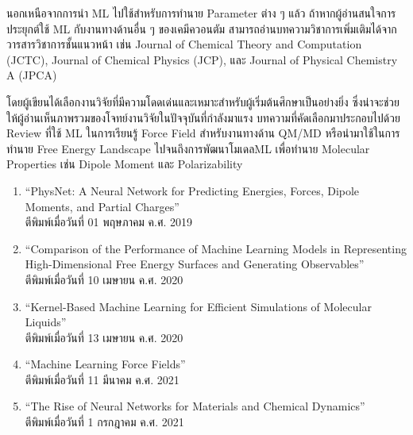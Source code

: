 นอกเหนือจากการนำ ML ไปใช้สำหรับการทำนาย Parameter ต่าง ๆ แล้ว ถ้าหากผู้อ่านสนใจการประยุกต์ใช้ ML กับงานทางด้านอื่น ๆ ของเคมีควอนตัม 
สามารถอ่านบทความวิชาการเพิ่มเติมได้จากวารสารวิชาการชั้นแนวหน้า เช่น Journal of Chemical Theory and Computation (JCTC), 
Journal of Chemical Physics (JCP), และ Journal of Physical Chemistry A (JPCA)

โดยผู้เขียนได้เลือกงานวิจัยที่มีความโดดเด่นและเหมาะสำหรับผู้เริ่มต้นศึกษาเป็นอย่างยิ่ง ซึ่งน่าจะช่วยให้ผู้อ่านเห็นภาพรวมของโจทย์งานวิจัยในปัจจุบันที่กำลังมาแรง
บทความที่คัดเลือกมาประกอบไปด้วย Review ที่ใช้ ML ในการเรียนรู้ Force Field สำหรับงานทางด้าน QM/MD หรือนำมาใช้ในการทำนาย Free Energy Landscape 
ไปจนถึงการพัฒนาโมเดลML เพื่อทำนาย Molecular Properties เช่น Dipole Moment และ Polarizability 

\begin{enumerate}
    \item \enquote{PhysNet: A Neural Network for Predicting Energies, Forces, Dipole Moments, and Partial Charges}\cite{unke2019}\\
    ตีพิมพ์เมื่อวันที่ 01 พฤษภาคม ค.ศ. 2019
    
    \item \enquote{Comparison of the Performance of Machine Learning Models in Representing High-Dimensional Free Energy Surfaces and Generating Observables}\cite{cendagorta2020}\\
    ตีพิมพ์เมื่อวันที่ 10 เมษายน ค.ศ. 2020
    
    \item \enquote{Kernel-Based Machine Learning for Efficient Simulations of Molecular Liquids}\cite{scherer2020}\\
    ตีพิมพ์เมื่อวันที่ 13 เมษายน ค.ศ. 2020

    \item \enquote{Machine Learning Force Fields}\cite{unke2021}\\
    ตีพิมพ์เมื่อวันที่ 11 มีนาคม ค.ศ. 2021\\

    \item \enquote{The Rise of Neural Networks for Materials and Chemical Dynamics}\cite{kulichenko2021}\\
    ตีพิมพ์เมื่อวันที่ 1 กรกฎาคม ค.ศ. 2021\\

\end{enumerate}
